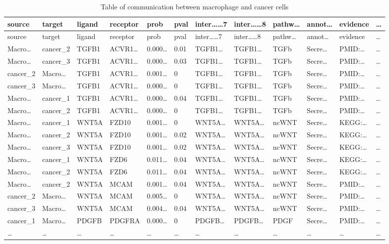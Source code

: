 \documentclass[
]{article}
\begin{document}
\begin{longtable}[]{@{}llllllllllll@{}}
\caption{\label{tab:table-of-communication-between-macrophage-and-cancer-cells}Table of communication between macrophage and cancer cells}\tabularnewline
\toprule
source & target & ligand & receptor & prob & pval & inter\ldots\ldots7 & inter\ldots\ldots8 & pathw\ldots{} & annot\ldots{} & evidence & \ldots{}\tabularnewline
\midrule
\endfirsthead
\toprule
source & target & ligand & receptor & prob & pval & inter\ldots\ldots7 & inter\ldots\ldots8 & pathw\ldots{} & annot\ldots{} & evidence & \ldots{}\tabularnewline
\midrule
\endhead
Macro\ldots{} & cancer\_2 & TGFB1 & ACVR1\ldots{} & 0.000\ldots{} & 0.01 & TGFB1\ldots{} & TGFB1\ldots{} & TGFb & Secre\ldots{} & PMID:\ldots{} & \ldots{}\tabularnewline
Macro\ldots{} & cancer\_3 & TGFB1 & ACVR1\ldots{} & 0.000\ldots{} & 0.03 & TGFB1\ldots{} & TGFB1\ldots{} & TGFb & Secre\ldots{} & PMID:\ldots{} & \ldots{}\tabularnewline
cancer\_2 & Macro\ldots{} & TGFB1 & ACVR1\ldots{} & 0.001\ldots{} & 0 & TGFB1\ldots{} & TGFB1\ldots{} & TGFb & Secre\ldots{} & PMID:\ldots{} & \ldots{}\tabularnewline
cancer\_3 & Macro\ldots{} & TGFB1 & ACVR1\ldots{} & 0.000\ldots{} & 0 & TGFB1\ldots{} & TGFB1\ldots{} & TGFb & Secre\ldots{} & PMID:\ldots{} & \ldots{}\tabularnewline
Macro\ldots{} & cancer\_1 & TGFB1 & ACVR1\ldots{} & 0.000\ldots{} & 0.04 & TGFB1\ldots{} & TGFB1\ldots{} & TGFb & Secre\ldots{} & PMID:\ldots{} & \ldots{}\tabularnewline
Macro\ldots{} & cancer\_2 & TGFB1 & ACVR1\ldots{} & 0.000\ldots{} & 0 & TGFB1\ldots{} & TGFB1\ldots{} & TGFb & Secre\ldots{} & PMID:\ldots{} & \ldots{}\tabularnewline
Macro\ldots{} & cancer\_1 & WNT5A & FZD10 & 0.001\ldots{} & 0 & WNT5A\ldots{} & WNT5A\ldots{} & ncWNT & Secre\ldots{} & KEGG:\ldots{} & \ldots{}\tabularnewline
Macro\ldots{} & cancer\_2 & WNT5A & FZD10 & 0.001\ldots{} & 0.02 & WNT5A\ldots{} & WNT5A\ldots{} & ncWNT & Secre\ldots{} & KEGG:\ldots{} & \ldots{}\tabularnewline
Macro\ldots{} & cancer\_3 & WNT5A & FZD10 & 0.001\ldots{} & 0.02 & WNT5A\ldots{} & WNT5A\ldots{} & ncWNT & Secre\ldots{} & KEGG:\ldots{} & \ldots{}\tabularnewline
Macro\ldots{} & cancer\_1 & WNT5A & FZD6 & 0.011\ldots{} & 0.04 & WNT5A\ldots{} & WNT5A\ldots{} & ncWNT & Secre\ldots{} & KEGG:\ldots{} & \ldots{}\tabularnewline
Macro\ldots{} & cancer\_2 & WNT5A & FZD6 & 0.011\ldots{} & 0.04 & WNT5A\ldots{} & WNT5A\ldots{} & ncWNT & Secre\ldots{} & KEGG:\ldots{} & \ldots{}\tabularnewline
Macro\ldots{} & cancer\_2 & WNT5A & MCAM & 0.001\ldots{} & 0.04 & WNT5A\ldots{} & WNT5A\ldots{} & ncWNT & Secre\ldots{} & PMID:\ldots{} & \ldots{}\tabularnewline
cancer\_2 & Macro\ldots{} & WNT5A & MCAM & 0.005\ldots{} & 0 & WNT5A\ldots{} & WNT5A\ldots{} & ncWNT & Secre\ldots{} & PMID:\ldots{} & \ldots{}\tabularnewline
cancer\_3 & Macro\ldots{} & WNT5A & MCAM & 0.004\ldots{} & 0.04 & WNT5A\ldots{} & WNT5A\ldots{} & ncWNT & Secre\ldots{} & PMID:\ldots{} & \ldots{}\tabularnewline
cancer\_1 & Macro\ldots{} & PDGFB & PDGFRA & 0.000\ldots{} & 0 & PDGFB\ldots{} & PDGFB\ldots{} & PDGF & Secre\ldots{} & PMID:\ldots{} & \ldots{}\tabularnewline
\ldots{} & \ldots{} & \ldots{} & \ldots{} & \ldots{} & \ldots{} & \ldots{} & \ldots{} & \ldots{} & \ldots{} & \ldots{} & \ldots{}\tabularnewline
\bottomrule
\end{longtable}
\end{document}
